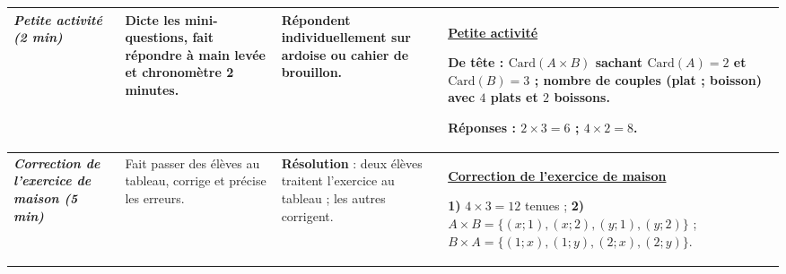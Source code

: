 \documentclass[10pt]{article}
\newcommand{\titreR}[1]{\underline{\textcolor{rougetitre}{\bfseries #1}}}
\newcommand{\seance}[1]{\fcolorbox{bleuseance}{bleufond}{\textcolor{bleuseance}{\bfseries #1}}}
\newcommand{\moment}[1]{\textbf{\itshape #1}}
\begin{document}
\begin{longtable}{|p{2.35cm}|p{5.35cm}|p{4.55cm}|p{13.85cm}|}
\hline
\seance{SEANCE 5} \newline \moment{Petite activité (2 min)} &
Dicte les mini-questions, fait répondre à main levée et chronomètre 2 minutes. &
Répondent individuellement sur ardoise ou cahier de brouillon. &
\titreR{Petite activité} \par
De tête : $\mathrm{Card}(A\times B)$ sachant $\mathrm{Card}(A)=2$ et
$\mathrm{Card}(B)=3$ ; nombre de couples (plat ; boisson) avec $4$ plats et $2$
boissons. \par
\textbf{Réponses :} $2\times3=6$ ; \; $4\times2=8$. \\ \hline

\moment{Correction de l'exercice de maison (5 min)} &
Fait passer des élèves au tableau, corrige et précise les erreurs. &
\textbf{Résolution} : deux élèves traitent l'exercice au tableau ; les autres corrigent. &
\titreR{Correction de l'exercice de maison} \par
\textbf{1)} $4\times3=12$ tenues ; \;
\textbf{2)} $A\times B=\{(x;1),(x;2),(y;1),(y;2)\}$ ; \;
$B\times A=\{(1;x),(1;y),(2;x),(2;y)\}$. \\ \hline


\end{longtable}
\end{document}
